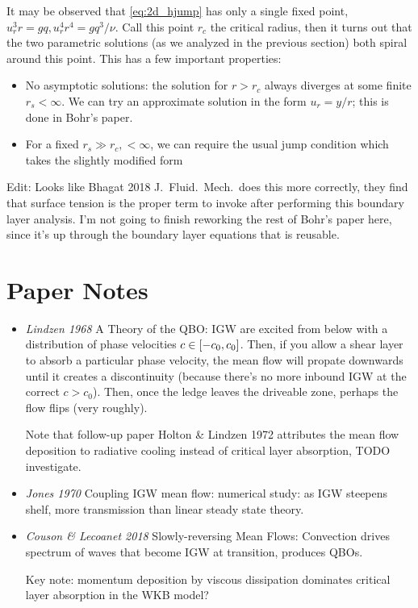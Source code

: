 \documentclass[11pt,
        usenames, %
        dvipsnames %
    ]{report}
\DeclarePairedDelimiter\s{\lbrack}{\rbrack}
\begin{document}
It may be observed that \autoref{eq:2d_hjump} has only a single fixed point,
$u_r^3r = gq, u_r^4r^4 = gq^3/\nu$. Call this point $r_c$ the critical radius,
then it turns out that the two parametric solutions (as we analyzed in the
previous section) both spiral around this point. This has a few important
properties:
\begin{itemize}
    \item No asymptotic solutions: the solution for $r > r_c$ always diverges
        at some finite $r_s < \infty$. We can try an approximate solution in the
        form $u_r = y / r$; this is done in Bohr's paper.

    \item For a fixed $r_s \gg r_c, < \infty$, we can require the usual jump
        condition which takes the slightly modified form
\end{itemize}

Edit: Looks like Bhagat 2018 J.\ Fluid.\ Mech.\ does this more correctly, they
find that surface tension is the proper term to invoke after performing this
boundary layer analysis. I'm not going to finish reworking the rest of Bohr's
paper here, since it's up through the boundary layer equations that is reusable.

\clearpage

\section{Paper Notes}

\begin{itemize}
    \item \emph{Lindzen 1968} A Theory of the QBO\@: IGW are excited from below
        with a distribution of phase velocities $c \in \s*{-c_0, c_0}$. Then, if
        you allow a shear layer to absorb a particular phase velocity, the mean
        flow will propate downwards until it creates a discontinuity (because
        there's no more inbound IGW at the correct $c > c_0$). Then, once the
        ledge leaves the driveable zone, perhaps the flow flips (very roughly).

        Note that follow-up paper Holton \& Lindzen 1972 attributes the mean
        flow deposition to radiative cooling instead of critical layer
        absorption, TODO investigate.

    \item \emph{Jones 1970} Coupling IGW mean flow: numerical study: as IGW
        steepens shelf, more transmission than linear steady state theory.

    \item \emph{Couson \& Lecoanet 2018} Slowly-reversing Mean Flows: Convection
        drives spectrum of waves that become IGW at transition, produces QBOs.

        Key note: momentum deposition by viscous dissipation dominates critical
        layer absorption in the WKB model?
\end{itemize}
\end{document}
